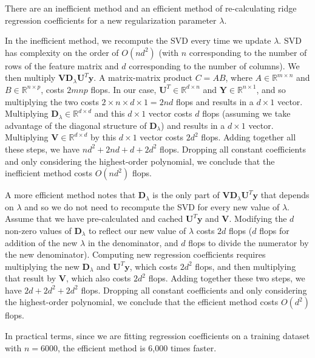 \documentclass{article}
\begin{document}
There are an inefficient method and an efficient method of re-calculating ridge
regression coefficients for a new regularization parameter $\lambda$.

In the inefficient method, we recompute the SVD every
time we update $\lambda$. SVD has complexity on the order of
$O(nd^2)$ (with $n$ corresponding to the number of rows of the feature matrix and 
$d$ corresponding to the number of columns). We then multiply $\mathbf{VD}_\lambda \mathbf{U}^T\mathbf{y}$.
A matrix-matrix product $C=AB$, where $A \in \mathbb{R}^{m \times n}$ and $B \in
\mathbb{R}^{n \times p}$, costs $2mnp$ flops. In our case, $\mathbf{U}^T \in
\mathbb{R}^{d \times n}$ and $\mathbf{Y} \in \mathbb{R}^{n \times 1}$, and so
multiplying the two costs $2 \times n \times d \times 1 = 2nd$ flops and results
in a $d \times 1$ vector. Multiplying $\mathbf{D}_\lambda \in \mathbb{R}^{d
\times d}$ and this $d \times 1$ vector costs $d$ flops (assuming we take advantage of the
diagonal structure of $\mathbf{D}_\lambda$) and results in a $d \times 1$ vector. 
Multiplying $\mathbf{V} \in \mathbb{R}^{d \times d}$ by this $d \times 1$ vector costs 
$2d^2$ flops. Adding together all these steps, we have $nd^2 + 2nd + d +
2d^2$ flops. Dropping all constant coefficients and only considering the
highest-order polynomial, we conclude that the inefficient method costs
$O(nd^2)$ flops.

A more efficient method notes that $\mathbf{D}_\lambda$ is the only part of 
$\mathbf{VD}_\lambda \mathbf{U}^T\mathbf{y}$ that depends on $\lambda$
and so we do not need to recompute the
SVD for every new value of $\lambda$. Assume that we have pre-calculated and
cached $\mathbf{U}^T\mathbf{y}$ and $\mathbf{V}$. Modifying the $d$ non-zero
values of $\mathbf{D}_\lambda$ to reflect our new value of $\lambda$ costs
$2d$ flops ($d$ flops for addition of the new $\lambda$ in the denominator, 
and $d$ flops to
divide the numerator by the new denominator). 
Computing new regression coefficients requires multiplying the new $\mathbf{D}_\lambda$ and
$\mathbf{U}^T\mathbf{y}$, which costs $2d^2$ flops, and then multiplying that
result by $\mathbf{V}$, which also costs $2d^2$ flops. Adding together these
two steps, we have $2d + 2d^2 + 2d^2$ flops. Dropping all constant coefficients and
only considering the highest-order polynomial, we conclude that the efficient method
costs $O(d^2)$ flops. 

In practical terms, since we are fitting regression coefficients on a training
dataset with $n=6000$, the efficient method is 6,000 times faster.
\end{document}
